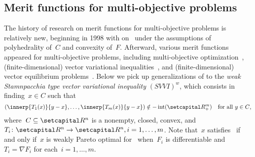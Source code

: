 \documentclass[../../main]{subfiles}
\begin{document}
\subsection{Merit functions for multi-objective problems} 
The history of research on merit functions for multi-objective problems is relatively new, beginning in 1998 with \textcite{Chen1998} on~ under the assumptions of polyhedrality of~$C$ and convexity of~$F$.
Afterward, various merit functions appeared for multi-objective problems, including multi-objective optimization~\cite{Liu2009,Dutta2017}, (finite-dimensional) vector variational inequalities~\cite{Chen2000,Konnov2005,Li2005,Yang2002,Yang2003,Charitha2010,Li2010}, and (finite-dimensional) vector equilibrium problems~\cite{Huang2007,Li2005,Li2007,Li2006,Mastroeni2003}.
Below we pick up generalizations of  to the \emph{weak Stamnpacchia type vector variational inequality} $(SVVI)^w$, which consists in finding~$x \in C$ such that
\begin{equation} \label{eq:SVVIw}
    (\innerp{T_1(x)}{y - x}, \dots, \innerp{T_m(x)}{y - x}) \notin - \interior(\setRpos^m) \forallcondition{y \in C}
    ,\end{equation}
where~$C \subseteq \setR^n$ is a nonempty, closed, convex, and $T_i \colon \setR^n \to \setR^n, i = 1, \dots, m$.
Note that~$x$ satisfies~ if and only if~$x$ is weakly Pareto optimal for~ when~$F_i$ is differentiable and~$T_i = \nabla F_i$ for each~$i = 1, \dots, m$.
\end{document}
